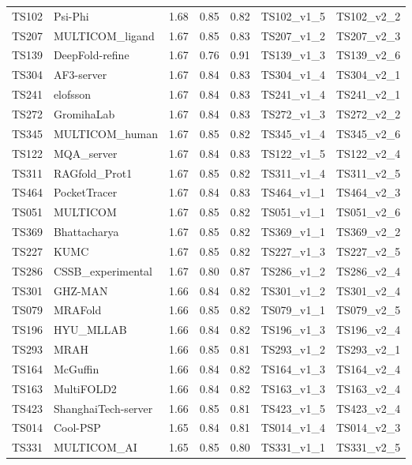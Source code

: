 \begin{longtable}{lllllll}
TS102 & Psi-Phi & 1.68 & 0.85 & 0.82 & TS102\_v1\_5 & TS102\_v2\_2 \\ 
TS207 & MULTICOM\_ligand & 1.67 & 0.85 & 0.83 & TS207\_v1\_2 & TS207\_v2\_3 \\ 
TS139 & DeepFold-refine & 1.67 & 0.76 & 0.91 & TS139\_v1\_3 & TS139\_v2\_6 \\ 
TS304 & AF3-server & 1.67 & 0.84 & 0.83 & TS304\_v1\_4 & TS304\_v2\_1 \\ 
TS241 & elofsson & 1.67 & 0.84 & 0.83 & TS241\_v1\_4 & TS241\_v2\_1 \\ 
TS272 & GromihaLab & 1.67 & 0.84 & 0.83 & TS272\_v1\_3 & TS272\_v2\_2 \\ 
TS345 & MULTICOM\_human & 1.67 & 0.85 & 0.82 & TS345\_v1\_4 & TS345\_v2\_6 \\ 
TS122 & MQA\_server & 1.67 & 0.84 & 0.83 & TS122\_v1\_5 & TS122\_v2\_4 \\ 
TS311 & RAGfold\_Prot1 & 1.67 & 0.85 & 0.82 & TS311\_v1\_4 & TS311\_v2\_5 \\ 
TS464 & PocketTracer & 1.67 & 0.84 & 0.83 & TS464\_v1\_1 & TS464\_v2\_3 \\ 
TS051 & MULTICOM & 1.67 & 0.85 & 0.82 & TS051\_v1\_1 & TS051\_v2\_6 \\ 
TS369 & Bhattacharya & 1.67 & 0.85 & 0.82 & TS369\_v1\_1 & TS369\_v2\_2 \\ 
TS227 & KUMC & 1.67 & 0.85 & 0.82 & TS227\_v1\_3 & TS227\_v2\_5 \\ 
TS286 & CSSB\_experimental & 1.67 & 0.80 & 0.87 & TS286\_v1\_2 & TS286\_v2\_4 \\ 
TS301 & GHZ-MAN & 1.66 & 0.84 & 0.82 & TS301\_v1\_2 & TS301\_v2\_4 \\ 
TS079 & MRAFold & 1.66 & 0.85 & 0.82 & TS079\_v1\_1 & TS079\_v2\_5 \\ 
TS196 & HYU\_MLLAB & 1.66 & 0.84 & 0.82 & TS196\_v1\_3 & TS196\_v2\_4 \\ 
TS293 & MRAH & 1.66 & 0.85 & 0.81 & TS293\_v1\_2 & TS293\_v2\_1 \\ 
TS164 & McGuffin & 1.66 & 0.84 & 0.82 & TS164\_v1\_3 & TS164\_v2\_4 \\ 
TS163 & MultiFOLD2 & 1.66 & 0.84 & 0.82 & TS163\_v1\_3 & TS163\_v2\_4 \\ 
TS423 & ShanghaiTech-server & 1.66 & 0.85 & 0.81 & TS423\_v1\_5 & TS423\_v2\_4 \\ 
TS014 & Cool-PSP & 1.65 & 0.84 & 0.81 & TS014\_v1\_4 & TS014\_v2\_3 \\ 
TS331 & MULTICOM\_AI & 1.65 & 0.85 & 0.80 & TS331\_v1\_1 & TS331\_v2\_5 \\ 

\end{longtable}
